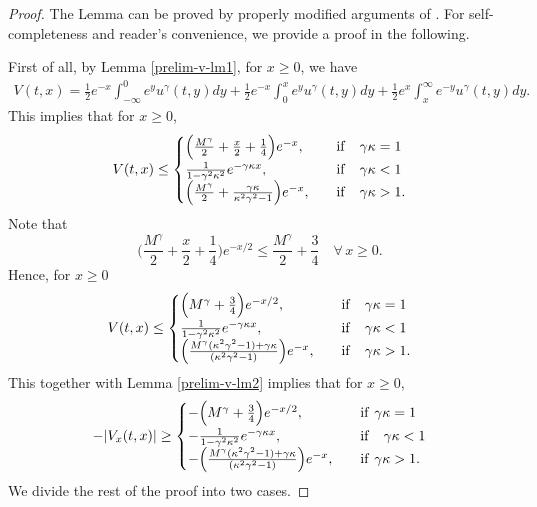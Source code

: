 \documentclass[11pt]{article} %
\theoremstyle{remark}
\theoremstyle{remark}
\numberwithin{equation}{section}
\numberwithin{figure}{section}
\numberwithin{table}{section}
\begin{document}
\begin{proof} The Lemma can be proved by properly modified  arguments of \cite[Theorem 2.1(3)]{SaSh2020}.
For self-completeness and reader's convenience, we provide a proof in the following.



First of all,  by Lemma \ref{prelim-v-lm1},  for  {$x\ge 0$}, we have
\begin{align*}
V(t,x)=\frac{1 }{2}e^{- x}\int_{-\infty}^0 e^{ y}u^\gamma (t,y)dy
+\frac{1}{2} e^{-x}\int_0^ x e^y u^\gamma(t,y)dy + \frac{1}{2}e^{x}\int_{x}^{\infty}e^{- y}u^\gamma (t,y)dy.
\end{align*}
This implies that for $x\ge 0$, 
\begin{equation*}
V(t,x)
\le  \begin{cases}
\Big(\frac{M^\gamma}{2}+\frac{x}{2}+\frac{1}{4}\Big) e^{-x},\quad &{\rm if}\quad  \gamma \kappa=1\cr
 \frac{1}{1-\gamma^2\kappa^2}  e^{-\gamma \kappa x},\quad &{\rm if}\quad \gamma\kappa<1\cr
\Big(\frac{M^\gamma}{2}+\frac{\gamma\kappa}{\kappa^2\gamma^2-1}\Big) e^{-x},\quad &{\rm if}\quad \gamma \kappa>1.
\end{cases}
\end{equation*}
Note that
$$
\Big(\frac{M^\gamma}{2}+\frac{x}{2}+\frac{1}{4}\Big) e^{-x/2}\le  \frac{M^\gamma}{2}+\frac{3}{4}\quad \forall\, x\ge 0.
$$
Hence, for $x\ge 0$
\begin{equation}
\label{V-estimate-eq1}
V(t,x)
\le  \begin{cases}
\Big(M^\gamma +\frac{3}{4}\Big) e^{-x/2},\quad &{\rm if}\quad  \gamma \kappa=1\cr
 \frac{1}{1-\gamma^2\kappa^2}  e^{-\gamma \kappa x},\quad &{\rm if}\quad \gamma\kappa<1\cr
\Big(\frac{M^\gamma(\kappa^2\gamma^2-1)+\gamma\kappa}{ (\kappa^2\gamma^2-1)}\Big) e^{-x},\quad &{\rm if}\quad  \gamma \kappa>1.
\end{cases}
\end{equation}
This together with Lemma \ref{prelim-v-lm2} implies that for $x\ge 0$,
\begin{equation}
\label{V-estimate-eq2}
-|V_x(t,x)|
\ge  \begin{cases}
-\Big(M^\gamma +\frac{3}{4}\Big) e^{-x/2},\quad &{\rm if}\,\, \gamma \kappa=1\cr
- \frac{1}{1-\gamma^2\kappa^2}  e^{-\gamma \kappa x},\quad &{\rm if}\quad \gamma\kappa<1\cr
-\Big(\frac{M^\gamma (\kappa^2\gamma^2-1) +\gamma\kappa}{(\kappa^2\gamma^2-1)}\Big) e^{-x},\quad &{\rm if}\,\, \gamma \kappa>1.
\end{cases}
\end{equation}
We divide the rest of the proof into two cases.


\end{proof}
\end{document}
